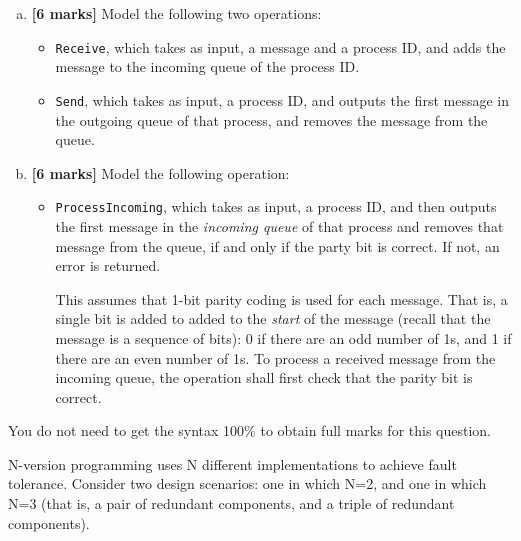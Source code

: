 \begin{enumerate}[(a)]
  
\item \textbf{[6 marks]} Model the following two operations: 

 \begin{itemize}
   \item \verb+Receive+, which takes as input, a message and a process ID, and adds the message to the incoming queue of the process ID.
   \item \verb+Send+, which takes as input, a process ID, and outputs the first message in the outgoing queue of that process, and removes the message from the queue.
 \end{itemize}


\item \textbf{[6 marks]} Model the following operation:

\begin{itemize}
  \item \verb+ProcessIncoming+, which takes as input, a process ID, and then  outputs the first message in the \emph{incoming queue} of that process and removes that message from the queue, if and only if the party bit is correct. If not, an error is returned.

 This assumes that 1-bit parity coding is used for each message. That is, a single bit is added to added to the \emph{start} of the message (recall that the message is a sequence of bits):  0 if there are an odd number of 1s, and 1 if there are an even number of 1s. To process a received message from the incoming queue, the operation shall first check that the parity bit is correct.

\end{itemize}

\end{enumerate}

You do not need to get the syntax 100\% to obtain full marks for this question.



N-version programming uses N different implementations to achieve fault tolerance. Consider two design scenarios: one in which N=2, and one in which N=3 (that is, a pair of redundant components, and a triple of redundant components).

